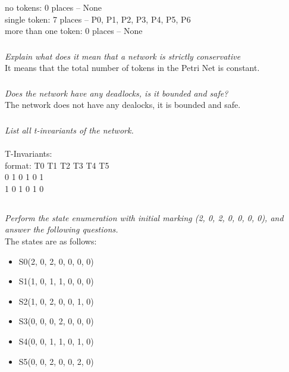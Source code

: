 \documentclass[letterpaper]{article}
\begin{document}
\noindent no tokens: 0 places -- None\\
single token: 7 places -- P0, P1, P2, P3, P4, P5, P6\\
more than one token: 0 places -- None\\

\subsubsection{}
\textit{Explain what does it mean that a network is strictly conservative}\\

It means that the total number of tokens in the Petri Net is constant.

\subsubsection{}
\textit{Does the network have any deadlocks, is it bounded and safe?}\\

The network does not have any dealocks, it is bounded and safe.

\subsubsection{}
\textit{List all t-invariants of the network.}\\ \\
T-Invariants: \\
format: T0 T1 T2 T3 T4 T5 \\
0 1 0 1 0 1 \\
1 0 1 0 1 0 \\

\subsection{}
\textit{Perform the state enumeration with initial marking (2, 0, 2, 0, 0, 0, 0), and answer the following questions.}\\

The states are as follows:
\begin{itemize}
 \item S0(2, 0, 2, 0, 0, 0, 0)
 \item S1(1, 0, 1, 1, 0, 0, 0)
 \item S2(1, 0, 2, 0, 0, 1, 0)
 \item S3(0, 0, 0, 2, 0, 0, 0)
 \item S4(0, 0, 1, 1, 0, 1, 0)
 \item S5(0, 0, 2, 0, 0, 2, 0)
\end{itemize}
\end{document}
